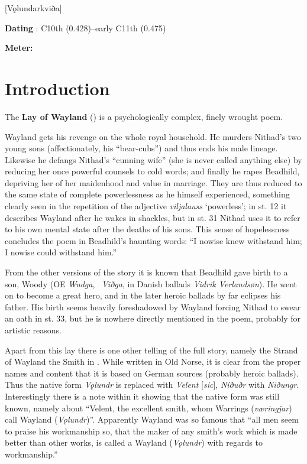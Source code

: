 [Vǫlundarkviða]

\begin{flushright}%
\textbf{Dating} \parencite{Sapp2022}: C10th (0.428)–early C11th (0.475)

\textbf{Meter:} \Fornyrdislag%
\end{flushright}%

\section{Introduction}

The \textbf{Lay of Wayland} (\Volundarkvida) is a psychologically complex, finely wrought poem.

Wayland gets his revenge on the whole royal household. He murders Nithad’s two young sons (affectionately, his “bear-cubs”) and thus ends his male lineage. Likewise he defangs Nithad’s “cunning wife” (she is never called anything else) by reducing her once powerful counsels to cold words; and finally he rapes Beadhild, depriving her of her maidenhood and value in marriage. They are thus reduced to the same state of complete powerlessness as he himself experienced, something clearly seen in the repetition of the adjective \emph{viljalauss} ‘powerless’; in st. 12 it describes Wayland after he wakes in shackles, but in st. 31 Nithad uses it to refer to his own mental state after the deaths of his sons. This sense of hopelessness concludes the poem in Beadhild’s haunting words: “I nowise knew withstand him; I nowise could withstand him.”

From the other versions of the story it is known that Beadhild gave birth to a son, Woody (OE \emph{Wudga}, \ThidreksSaga\ \emph{Viðga}, in Danish ballads \emph{Vidrik Verlandsøn}). He went on to become a great hero, and in the later heroic ballads by far eclipses his father. His birth seems heavily foreshadowed by Wayland forcing Nithad to swear an oath in st. 33, but he is nowhere directly mentioned in the poem, probably for artistic reasons.

Apart from this lay there is one other telling of the full story, namely the Strand of Wayland the Smith in \ThidreksSaga. While written in Old Norse, it is clear from the proper names and content that it is based on German sources (probably heroic ballads). Thus the native form \emph{Vǫlundr} is replaced with \emph{Velent} [\emph{sic}], \emph{Níðuðr} with \emph{Niðungr}. Interestingly there is a note within it showing that the native form was still known, namely about “Velent, the excellent smith, whom Warrings (\emph{væringjar}) call Wayland (\emph{Vǫlundr})”. Apparently Wayland was so famous that “all men seem to praise his workmanship so, that the maker of any smith’s work which is made better than other works, is called a Wayland (\emph{Vǫlundr}) with regards to workmanship.”

